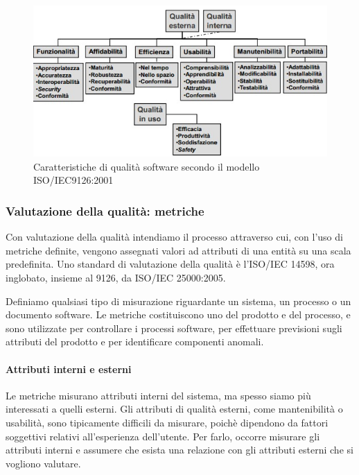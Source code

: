 \begin{figure}[h]
  \centering
  \includegraphics[scale=0.6]{imgs/isoiec_9126_2001.jpg}
  \caption{Caratteristiche di qualità software secondo il modello
    ISO/IEC9126:2001}
\end{figure}

\subsubsection{Valutazione della qualità: metriche}

Con valutazione della qualità intendiamo il processo attraverso cui, con l'uso
di metriche definite, vengono assegnati valori ad attributi di una entità su una
scala predefinita. Uno standard di valutazione della qualità è l'ISO/IEC 14598,
ora inglobato, insieme al 9126, da ISO/IEC 25000:2005.

Definiamo  qualsiasi tipo di misurazione riguardante un sistema,
un processo o un documento software. Le metriche costituiscono uno
 del prodotto e del processo, e sono
utilizzate per controllare i processi software, per effettuare previsioni sugli
attributi del prodotto e per identificare componenti anomali.

\paragraph{Attributi interni e esterni}

Le metriche misurano attributi interni del sistema, ma spesso siamo più
interessati a quelli esterni. Gli attributi di qualità esterni, come
mantenibilità o usabilità, sono tipicamente difficili da misurare, poichè
dipendono da fattori soggettivi relativi all'esperienza dell'utente. Per farlo,
occorre misurare gli attributi interni e assumere che esista una relazione con
gli attributi esterni che si vogliono valutare.

